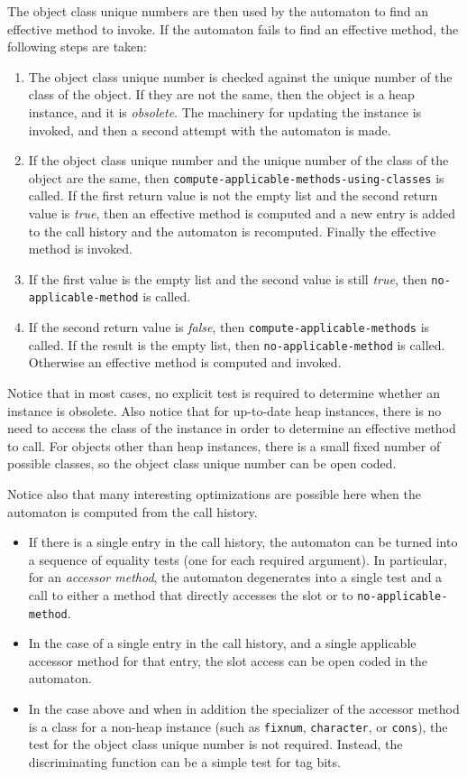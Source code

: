 The object class unique numbers are then used by the automaton to find
an effective method to invoke.  If the automaton fails to find an
effective method, the following steps are taken:

\begin{enumerate}
\item The object class unique number is checked against the unique
  number of the class of the object.  If they are not the same, then
  the object is a heap instance, and it is \emph{obsolete}.  The
  machinery for updating the instance is invoked, and then a second
  attempt with the automaton is made. 
\item If the object class unique number and the unique number of the
  class of the object are the same, then
  \texttt{compute-applicable-methods-using-classes} is called.  If the
  first return value is not the empty list and the second return value
  is \textit{true}, then an effective method is computed and a new
  entry is added to the call history and the automaton is recomputed.
  Finally the effective method is invoked.
\item If the first value is the empty list and the second value is
  still \textit{true}, then \texttt{no-applicable-method} is called.
\item If the second return value is \textit{false}, then 
 \texttt{compute-applicable-methods} is called.  If the result is the
 empty list, then \texttt{no-applicable-method} is called.  Otherwise
 an effective method is computed and invoked. 
\end{enumerate}

Notice that in most cases, no explicit test is required to determine
whether an instance is obsolete.  Also notice that for up-to-date heap
instances, there is no need to access the class of the instance in
order to determine an effective method to call.  For objects other
than heap instances, there is a small fixed number of possible
classes, so the object class unique number can be open coded. 

Notice also that many interesting optimizations are possible here when
the automaton is computed from the call history.

\begin{itemize}
\item If there is a single entry in the call history, the automaton
  can be turned into a sequence of equality tests (one for each
  required argument).  In particular, for an \emph{accessor method},
  the automaton degenerates into a single test and a call to either
  a method that directly accesses the slot or to
  \texttt{no-applicable-method}. 
\item In the case of a single entry in the call history, and a single
  applicable accessor method for that entry, the slot access can be
  open coded in the automaton. 
\item In the case above and when in addition the specializer of the
  accessor method is a class for a non-heap instance (such as
  \texttt{fixnum}, \texttt{character}, or \texttt{cons}), the test for
  the object class unique number is not required.  Instead, the
  discriminating function can be a simple test for tag bits.
\end{itemize}

